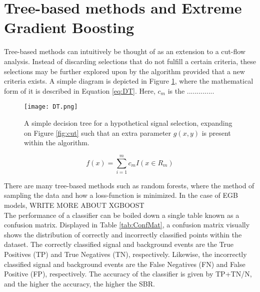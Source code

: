 \section{Tree-based methods and Extreme Gradient Boosting}

Tree-based methods can intuitively be thought of as an extension to a cut-flow analysis. Instead of discarding selections that do not fulfill a certain criteria, these selections may be further explored upon by the algorithm provided that a new criteria exists. A simple diagram is depicted in Figure \ref{fig:tree}, where the mathematical form of it is described in Equation \ref{eq:DT}. Here, $c_m$ is the ..............

\begin{figure}[htbp]
    \centering
    \texttt{[image: DT.png]}
    \caption{A simple decision tree for a hypothetical signal selection, expanding on Figure \ref{fig:cut} such that an extra parameter $g(x,y)$ is present within the algorithm.}
    \label{fig:tree}
\end{figure}

\begin{equation}
    f(x) = \sum_{i=1}^m c_m I(x\in R_m)
    \label{eq:DT}
\end{equation}

There are many tree-based methods such as random forests, where the method of sampling the data and how a loss-function is minimized. In the case of EGB models, WRITE MORE ABOUT XGBOOST \\

The performance of a classifier can be boiled down a single table known as a confusion matrix. Displayed in Table \ref{tab:ConfMat}, a confusion matrix visually shows the distribution of correctly and incorrectly classified points within the dataset. The correctly classified signal and background events are the True Positives (TP) and True Negatives (TN), respectively. Likewise, the incorrectly classified signal and background events are the False Negatives (FN) and False Positive (FP), respectively. The accuracy of the classifier is given by TP+TN/N, and the higher the accuracy, the higher the SBR. \\

